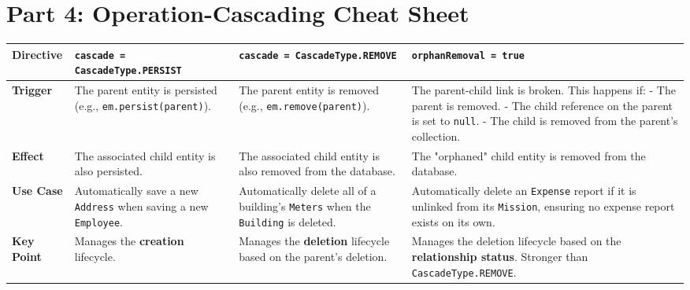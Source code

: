 \section*{Part 4: Operation-Cascading Cheat Sheet}
\begin{center}
\begin{tabular}{|l|p{4cm}|p{4cm}|p{4cm}|}
\hline
\textbf{Directive} & \texttt{cascade = CascadeType.PERSIST} & \texttt{cascade = CascadeType.REMOVE} & \texttt{orphanRemoval = true} \\
\hline
\textbf{Trigger} & The parent entity is persisted (e.g., \texttt{em.persist(parent)}). & The parent entity is removed (e.g., \texttt{em.remove(parent)}). & The parent-child link is broken. This happens if: \newline - The parent is removed. \newline - The child reference on the parent is set to \texttt{null}. \newline - The child is removed from the parent's collection. \\
\hline
\textbf{Effect} & The associated child entity is also persisted. & The associated child entity is also removed from the database. & The "orphaned" child entity is removed from the database. \\
\hline
\textbf{Use Case} & Automatically save a new \texttt{Address} when saving a new \texttt{Employee}. & Automatically delete all of a building's \texttt{Meters} when the \texttt{Building} is deleted. & Automatically delete an \texttt{Expense} report if it is unlinked from its \texttt{Mission}, ensuring no expense report exists on its own. \\
\hline
\textbf{Key Point} & Manages the \textbf{creation} lifecycle. & Manages the \textbf{deletion} lifecycle based on the parent's deletion. & Manages the deletion lifecycle based on the \textbf{relationship status}. Stronger than \texttt{CascadeType.REMOVE}. \\
\hline
\end{tabular}
\end{center}